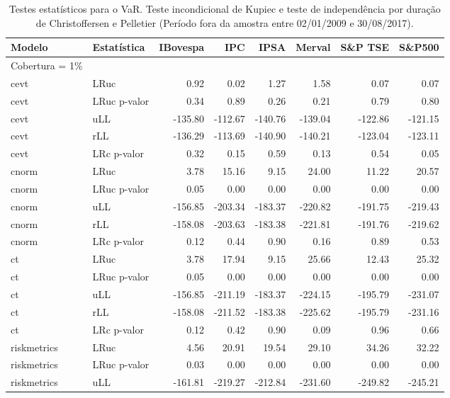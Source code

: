 \begin{longtable}{llrrrrrr}
\caption{Testes estatísticos para o VaR. Teste incondicional de Kupiec e teste de
             independência por duração de Christoffersen e Pelletier (Período fora da 
             amostra entre 02/01/2009 e 30/08/2017).} \\ 
  \hline
Modelo & Estatística & IBovespa & IPC & IPSA & Merval & S\&P TSE & S\&P500 \\ 
  \hline
Cobertura = 1\% &  &  &  &  &  &  &  \\ 
  cevt & LRuc & 0.92 & 0.02 & 1.27 & 1.58 & 0.07 & 0.07 \\ 
  cevt & LRuc p-valor & 0.34 & 0.89 & 0.26 & 0.21 & 0.79 & 0.80 \\ 
  cevt & uLL & -135.80 & -112.67 & -140.76 & -139.04 & -122.86 & -121.15 \\ 
  cevt & rLL & -136.29 & -113.69 & -140.90 & -140.21 & -123.04 & -123.11 \\ 
  cevt & LRc p-valor & 0.32 & 0.15 & 0.59 & 0.13 & 0.54 & 0.05 \\ 
  cnorm & LRuc & 3.78 & 15.16 & 9.15 & 24.00 & 11.22 & 20.57 \\ 
  cnorm & LRuc p-valor & 0.05 & 0.00 & 0.00 & 0.00 & 0.00 & 0.00 \\ 
  cnorm & uLL & -156.85 & -203.34 & -183.37 & -220.82 & -191.75 & -219.43 \\ 
  cnorm & rLL & -158.08 & -203.63 & -183.38 & -221.81 & -191.76 & -219.62 \\ 
  cnorm & LRc p-valor & 0.12 & 0.44 & 0.90 & 0.16 & 0.89 & 0.53 \\ 
  ct & LRuc & 3.78 & 17.94 & 9.15 & 25.66 & 12.43 & 25.32 \\ 
  ct & LRuc p-valor & 0.05 & 0.00 & 0.00 & 0.00 & 0.00 & 0.00 \\ 
  ct & uLL & -156.85 & -211.19 & -183.37 & -224.15 & -195.79 & -231.07 \\ 
  ct & rLL & -158.08 & -211.52 & -183.38 & -225.62 & -195.79 & -231.16 \\ 
  ct & LRc p-valor & 0.12 & 0.42 & 0.90 & 0.09 & 0.96 & 0.66 \\ 
  riskmetrics & LRuc & 4.56 & 20.91 & 19.54 & 29.10 & 34.26 & 32.22 \\ 
  riskmetrics & LRuc p-valor & 0.03 & 0.00 & 0.00 & 0.00 & 0.00 & 0.00 \\ 
  riskmetrics & uLL & -161.81 & -219.27 & -212.84 & -231.60 & -249.82 & -245.21 \\ 

\end{longtable}
